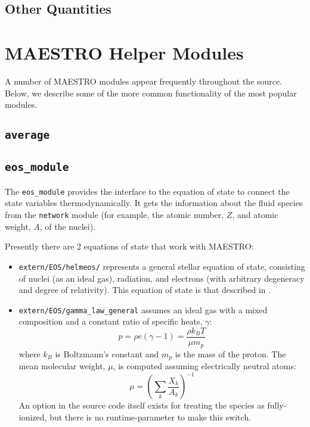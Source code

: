 \subsection{Other Quantities}


\section{MAESTRO Helper Modules}

A number of MAESTRO modules appear frequently throughout the source.
Below, we describe some of the more common functionality of the most
popular modules.

\subsection{\tt average}

\subsection{{\tt eos\_module}}

The {\tt eos\_module} provides the interface to the equation of 
state to connect the state variables thermodynamically.  It 
gets the information about the fluid species from the {\tt network}
module (for example, the atomic number, $Z$, and atomic weight, $A$,
of the nuclei).

Presently there are 2 equations of state that work with MAESTRO:
\begin{itemize}
\item {\tt extern/EOS/helmeos/} represents a general stellar equation 
      of state, consisting of nuclei (as an ideal gas), radiation,
      and electrons (with arbitrary degeneracy and degree of relativity).
      This equation of state is that described in \cite{timmes_eos}.

\item {\tt extern/EOS/gamma\_law\_general} assumes an ideal gas with a mixed 
     composition and a constant ratio of specific heats, $\gamma$:
      \begin{equation}
      p = \rho e (\gamma - 1) = \frac{\rho k_B T}{\mu m_p} 
      \end{equation}
     where $k_B$ is Boltzmann's constant and $m_p$ is the mass of the
     proton.
     The mean molecular weight, $\mu$, is computed assuming 
     electrically neutral atoms:
     \begin{equation}
     \mu = \left ( \sum_k \frac{X_k}{A_k} \right )^{-1}
     \end{equation}
     An option in the source code itself exists for treating the
     species as fully-ionized, but there is no runtime-parameter to
     make this switch.
\end{itemize}

